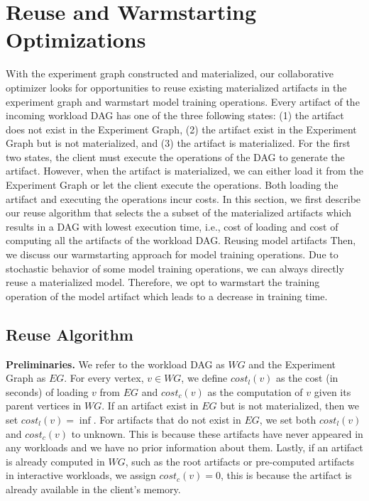 \section{Reuse and Warmstarting Optimizations}\label{sec-reuse-and-warmstarting}
With the experiment graph constructed and materialized, our collaborative optimizer looks for opportunities to reuse existing materialized artifacts in the experiment graph and warmstart model training operations.
Every artifact of the incoming workload DAG has one of the three following states: (1) the artifact does not exist in the Experiment Graph, (2) the artifact exist in the Experiment Graph but is not materialized, and (3) the artifact is materialized.
For the first two states, the client must execute the operations of the DAG to generate the artifact.
However, when the artifact is materialized, we can either load it from the Experiment Graph or let the client execute the operations.
Both loading the artifact and executing the operations incur costs.
In this section, we first describe our reuse algorithm that selects the a subset of the materialized artifacts which results in a DAG with lowest execution time, i.e., cost of loading and cost of computing all the artifacts of the workload DAG.
Reusing model artifacts 
Then, we discuss our warmstarting approach for model training operations.
Due to stochastic behavior of some model training operations, we can always directly reuse a materialized model.
Therefore, we opt to warmstart the training operation of the model artifact which leads to a decrease in training time.

\subsection{Reuse Algorithm} 
\textbf{Preliminaries.} 
We refer to the workload DAG as $WG$ and the Experiment Graph as $EG$.
For every vertex, $v \in WG$, we define $cost_l(v)$ as the cost (in seconds) of loading $v$ from $EG$  and $cost_c(v)$ as the computation of $v$ given its parent vertices in $WG$.
If an artifact exist in $EG$ but is not materialized, then we set $cost_l(v)=\inf$.
For artifacts that do not exist in $EG$, we set both $cost_l(v)$ and $cost_c(v)$ to unknown.
This is because these artifacts have never appeared in any workloads and we have no prior information about them.
Lastly, if an artifact is already computed in $WG$, such as the root artifacts or pre-computed artifacts in interactive workloads, we assign $cost_c(v)=0$, this is because the artifact is already available in the client's memory.

